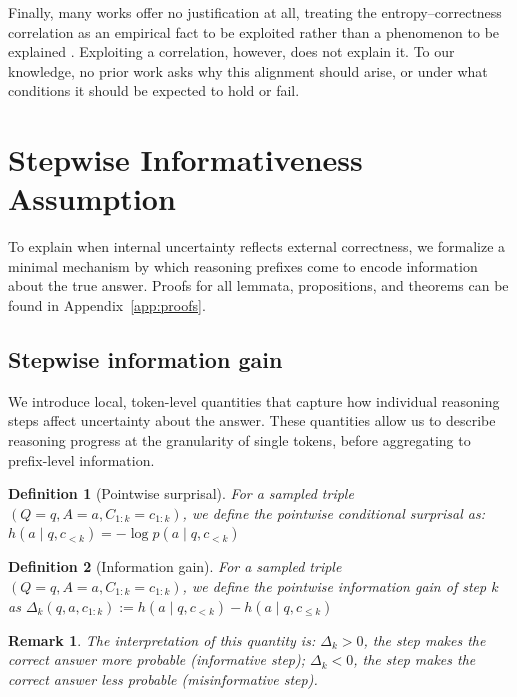 \documentclass{article}
\newtheorem{remark}{Remark}
\newtheorem{definition}{Definition}
\begin{document}
Finally, many works offer no justification at all, treating the entropy--correctness correlation as an empirical fact to be exploited rather than a phenomenon to be explained \cite{liu2025tokensignaturepredictingchainofthought, zhang2025entropybasedexplorationconductionmultistep}. Exploiting a correlation, however, does not explain it. To our knowledge, no prior work asks why this alignment should arise, or under what conditions it should be expected to hold or fail.



\section{Stepwise Informativeness Assumption}
\label{sec:assumption}

To explain when internal uncertainty reflects external correctness, we formalize a minimal mechanism by which reasoning prefixes come to encode information about the true answer. Proofs for all lemmata, propositions, and theorems can be found in Appendix~\ref{app:proofs}.

\subsection{Stepwise information gain}
We introduce local, token-level quantities that capture how individual reasoning steps affect uncertainty about the answer. These quantities allow us to describe reasoning progress at the granularity of single tokens, before aggregating to prefix-level information.

\begin{definition}[Pointwise surprisal]
    For a sampled triple $(Q=q,A=a,C_{1:k}=c_{1:k})$, we define the \emph{pointwise conditional surprisal} as:
    $h(a\mid q,c_{<k})=-\log p(a \mid q, c_{<k})$
\end{definition}

\begin{definition}[Information gain]
    For a sampled triple $(Q=q,A=a,C_{1:k}=c_{1:k})$, we define the  \emph{pointwise information gain of step $k$} as $
    \Delta_k(q,a,c_{1:k}):=h(a\mid q,c_{<k})-h(a\mid q,c_{\leq k})
    \label{eq:pointwise-delta}$
\end{definition}

\begin{remark}
The interpretation of this quantity is: $\Delta_k>0$, the step makes the correct answer more probable (informative step); $\Delta_k<0$, the step makes the correct answer less probable (misinformative step).
\end{remark}
\end{document}
